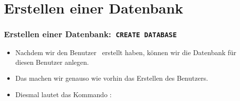 \documentclass[aspectratio=169,mathserif,notheorems]{beamer}%
\begin{document}
\section{Erstellen einer Datenbank}
%
\begin{frame}[t]
\frametitle{Erstellen einer Datenbank:~\texttt{CREATE DATABASE}}%
\begin{itemize}%
\item Nachdem wir den Benutzer~ erstellt haben, können wir die Datenbank  für diesen Benutzer anlegen.%
\item<2-> Das machen wir genauso wie vorhin das Erstellen des Benutzers.
\item<3-> Diesmal lautet das Kommando :%
\end{itemize}%
%
\end{frame}
%
\end{document}
